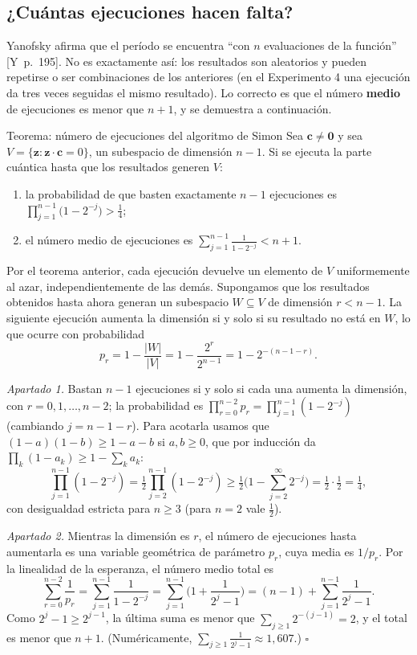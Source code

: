 \documentclass[11pt, a4paper, twoside, openright]{report}
\newcommand{\bz}{\mathbf{z}}
\newcommand{\bc}{\mathbf{c}}
\newcommand{\bcero}{\mathbf{0}}
\newcommand{\Yan}[1]{\textcolor{rosaviejo}{\small[Y~#1]}}  %
\begin{document}
\subsection{¿Cuántas ejecuciones hacen falta?}

\noindent Yanofsky afirma que el período se encuentra ``con $n$ evaluaciones de la función'' \Yan{p.~195}. No es exactamente así: los resultados son aleatorios y pueden repetirse o ser combinaciones de los anteriores (en el Experimento 4 una ejecución da tres veces seguidas el mismo resultado). Lo correcto es que el número \textbf{medio} de ejecuciones es menor que $n+1$, y se demuestra a continuación.

\begin{teoria}{Teorema: número de ejecuciones del algoritmo de Simon}
Sea $\bc\neq\bcero$ y sea $V = \{\bz : \bz\cdot\bc = 0\}$, un subespacio de dimensión $n-1$. Si se ejecuta la parte cuántica hasta que los resultados generen $V$:
\begin{enumerate}
\item la probabilidad de que basten exactamente $n-1$ ejecuciones es $\prod_{j=1}^{n-1}\big(1 - 2^{-j}\big) > \frac14$;
\item el número medio de ejecuciones es $\displaystyle\sum_{j=1}^{n-1}\frac{1}{1-2^{-j}} < n + 1$.
\end{enumerate}
\end{teoria}

\begin{demo}
Por el teorema anterior, cada ejecución devuelve un elemento de $V$ uniformemente al azar, independientemente de las demás. Supongamos que los resultados obtenidos hasta ahora generan un subespacio $W\subseteq V$ de dimensión $r < n-1$. La siguiente ejecución aumenta la dimensión si y solo si su resultado no está en $W$, lo que ocurre con probabilidad
\[ p_r = 1 - \frac{|W|}{|V|} = 1 - \frac{2^r}{2^{n-1}} = 1 - 2^{-(n-1-r)}. \]

\textit{Apartado 1.} Bastan $n-1$ ejecuciones si y solo si cada una aumenta la dimensión, con $r = 0, 1, \dots, n-2$; la probabilidad es $\prod_{r=0}^{n-2}p_r = \prod_{j=1}^{n-1}(1-2^{-j})$ (cambiando $j = n-1-r$). Para acotarla usamos que $(1-a)(1-b)\ge 1-a-b$ si $a, b\ge0$, que por inducción da $\prod_k(1-a_k)\ge 1-\sum_k a_k$:
\[ \prod_{j=1}^{n-1}(1-2^{-j}) = \tfrac12\prod_{j=2}^{n-1}(1-2^{-j}) \ge \tfrac12\Big(1 - \sum_{j=2}^{\infty}2^{-j}\Big) = \tfrac12\cdot\tfrac12 = \tfrac14, \]
con desigualdad estricta para $n\ge3$ (para $n = 2$ vale $\frac12$).

\textit{Apartado 2.} Mientras la dimensión es $r$, el número de ejecuciones hasta aumentarla es una variable geométrica de parámetro $p_r$, cuya media es $1/p_r$. Por la linealidad de la esperanza, el número medio total es
\[ \sum_{r=0}^{n-2}\frac{1}{p_r} = \sum_{j=1}^{n-1}\frac{1}{1-2^{-j}} = \sum_{j=1}^{n-1}\Big(1 + \frac{1}{2^j-1}\Big) = (n-1) + \sum_{j=1}^{n-1}\frac{1}{2^j-1}. \]
Como $2^j - 1\ge 2^{j-1}$, la última suma es menor que $\sum_{j\ge1}2^{-(j-1)} = 2$, y el total es menor que $n+1$. (Numéricamente, $\sum_{j\ge1}\frac{1}{2^j-1}\approx1{,}607$.) \hfill$\square$
\end{demo}
\end{document}
